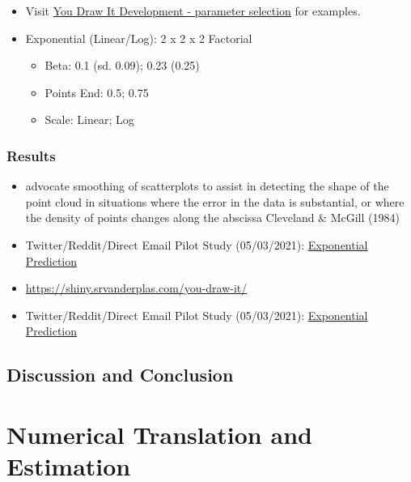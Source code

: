 \documentclass[print]{nuthesis}
\providecommand{\tightlist}{%
  \setlength{\itemsep}{0pt}\setlength{\parskip}{0pt}}
\begin{document}
\begin{itemize}
\item
  Visit \href{https://emily-robinson.shinyapps.io/you-draw-it-parameter-selection/}{You Draw It Development - parameter selection} for examples.
\item
  Exponential (Linear/Log): 2 x 2 x 2 Factorial

  \begin{itemize}
  \tightlist
  \item
    Beta: 0.1 (sd. 0.09); 0.23 (0.25)
  \item
    Points End: 0.5; 0.75
  \item
    Scale: Linear; Log
  \end{itemize}
\end{itemize}

\hypertarget{results-2}{%
\subsection{Results}\label{results-2}}

\begin{itemize}
\tightlist
\item
  advocate smoothing of scatterplots to assist in detecting the shape of the point cloud in situations where the error in the data is substantial, or where the density of points changes along the abscissa Cleveland \& McGill (1984)
\item
  Twitter/Reddit/Direct Email Pilot Study (05/03/2021): \href{https://srvanderplas.github.io/Perception-of-Log-Scales/you-draw-it-development/you-draw-it-pilot-app/analyses/you-draw-it-exponential-prediction-pilot.html}{Exponential Prediction}
\item
  \url{https://shiny.srvanderplas.com/you-draw-it/}
\item
  Twitter/Reddit/Direct Email Pilot Study (05/03/2021): \href{https://srvanderplas.github.io/Perception-of-Log-Scales/you-draw-it-development/you-draw-it-pilot-app/analyses/you-draw-it-exponential-prediction-pilot.html}{Exponential Prediction}
\end{itemize}

\hypertarget{discussion-and-conclusion-1}{%
\section{Discussion and Conclusion}\label{discussion-and-conclusion-1}}

\hypertarget{estimation}{%
\chapter{Numerical Translation and Estimation}\label{estimation}}
\end{document}
